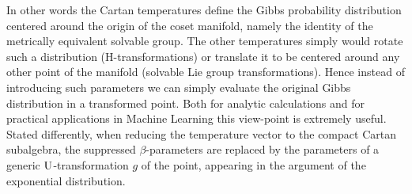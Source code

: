 \documentclass[10pt,a4paper]{article}
\begin{document}
  In other words the Cartan temperatures define the Gibbs probability distribution centered around the origin of the coset manifold, namely the identity of the metrically equivalent solvable group. The other temperatures simply
  would rotate such a distribution (H-transformations) or translate it to be centered around any other point of the manifold (solvable Lie group transformations). Hence instead of introducing such parameters we can simply evaluate
  the original Gibbs distribution in a transformed point. Both for analytic calculations and for practical applications in Machine Learning this view-point is extremely useful.  {Stated differently, when reducing the temperature vector to the compact Cartan subalgebra, the suppressed  $\beta$-parameters are replaced by the parameters of a generic ${\rm U}$-transformation $g$ of the point, appearing in the argument of the exponential distribution.}
\end{document}
